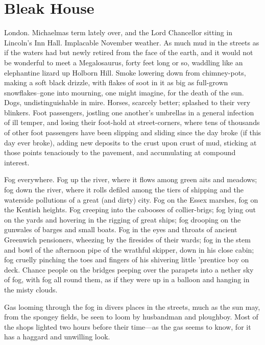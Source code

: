 \documentclass[a4paper]{article}
\begin{document}
\tableofcontents
\newpage
\section{Bleak House}
London. Michaelmas term lately over, and the Lord Chancellor sitting in Lincoln’s
Inn Hall. Implacable November weather. As much mud in the streets as if the
waters had but newly retired from the face of the earth, and it would not be
wonderful to meet a Megalosaurus, forty feet long or so, waddling like an
elephantine lizard up Holborn Hill. Smoke lowering down from chimney-pots,
making a soft black drizzle, with flakes of soot in it as big as full-grown
snowflakes–gone into mourning, one might imagine, for the death of the sun.
Dogs, undistinguishable in mire. Horses, scarcely better; splashed to their very
blinkers. Foot passengers, jostling one another’s umbrellas in a general infection of
ill temper, and losing their foot-hold at street-corners, where tens of thousands of
other foot passengers have been slipping and sliding since the day broke (if this day
ever broke), adding new deposits to the crust upon crust of mud, sticking at those
points tenaciously to the pavement, and accumulating at compound interest.

Fog everywhere. Fog up the river, where it flows among green aits and meadows;
fog down the river, where it rolls defiled among the tiers of shipping and the
waterside pollutions of a great (and dirty) city. Fog on the Essex marshes, fog on
the Kentish heights. Fog creeping into the cabooses of collier-brigs; fog lying out on
the yards and hovering in the rigging of great ships; fog drooping on the gunwales
of barges and small boats. Fog in the eyes and throats of ancient Greenwich
pensioners, wheezing by the firesides of their wards; fog in the stem and bowl of the
afternoon pipe of the wrathful skipper, down in his close cabin; fog cruelly
pinching the toes and fingers of his shivering little ’prentice boy on deck. Chance
people on the bridges peeping over the parapets into a nether sky of fog, with fog all
round them, as if they were up in a balloon and hanging in the misty clouds.

Gas looming through the fog in divers places in the streets, much as the sun may,
from the spongey fields, be seen to loom by husbandman and ploughboy. Most of
the shops lighted two hours before their time—as the gas seems to know, for it has a
haggard and unwilling look.
\end{document}
